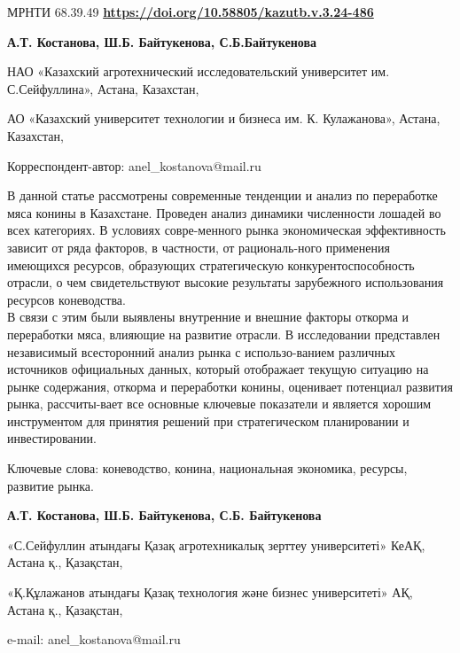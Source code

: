\newpage
МРНТИ 68.39.49
\hfill {\bfseries \href{https://doi.org/10.58805/kazutb.v.3.24-486}{https://doi.org/10.58805/kazutb.v.3.24-486}}


\begin{center}

{\bfseries А.Т. Костанова\envelope, Ш.Б. Байтукенова, С.Б.Байтукенова}

НАО «Казахский агротехнический исследовательский университет им.
С.Сейфуллина», Астана, Казахстан,

АО «Казахский университет технологии и бизнеса им. К. Кулажанова», Астана, Казахстан,
\end{center}

\envelope Корреспондент-автор: anel\_kostanova@mail.ru\vspace{0.5cm}

В данной статье рассмотрены современные тенденции и анализ по
переработке мяса конины в Казахстане. Проведен анализ динамики
численности лошадей во всех категориях. В условиях совре-менного рынка
экономическая эффективность зависит от ряда факторов, в частности, от
рациональ-ного применения имеющихся ресурсов, образующих стратегическую
конкурентоспособность отрасли, о чем свидетельствуют высокие результаты
зарубежного использования ресурсов коневодства. \\В связи с этим были
выявлены внутренние и внешние факторы откорма и переработки мяса,
влияющие на развитие отрасли. В исследовании представлен независимый
всесторонний анализ рынка с использо-ванием различных источников
официальных данных, который отображает текущую ситуацию на рынке
содержания, откорма и переработки конины, оценивает потенциал развития
рынка, рассчиты-вает все основные ключевые показатели и является хорошим
инструментом для принятия решений при стратегическом планировании и
инвестировании.

Ключевые слова: коневодство, конина, национальная экономика, ресурсы,
развитие рынка.

\begin{center}

{\bfseries А.Т. Костанова\envelope, Ш.Б. Байтукенова, С.Б.
Байтукенова}

«С.Сейфуллин атындағы Қазақ агротехникалық зерттеу университеті» КеАҚ, Астана қ., Қазақстан,

«Қ.Құлажанов атындағы Қазақ технология және бизнес университеті» АҚ, Астана қ., Қазақстан,

e-mail: anel\_kostanova@mail.ru
\end{center}

